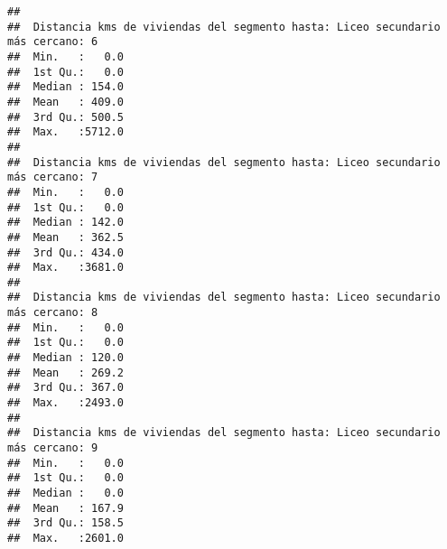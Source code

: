 \documentclass[11pt,]{article}
\begin{document}
\begin{verbatim}
##                                                                                
##  Distancia kms de viviendas del segmento hasta: Liceo secundario más cercano: 6
##  Min.   :   0.0                                                                
##  1st Qu.:   0.0                                                                
##  Median : 154.0                                                                
##  Mean   : 409.0                                                                
##  3rd Qu.: 500.5                                                                
##  Max.   :5712.0                                                                
##                                                                                
##  Distancia kms de viviendas del segmento hasta: Liceo secundario más cercano: 7
##  Min.   :   0.0                                                                
##  1st Qu.:   0.0                                                                
##  Median : 142.0                                                                
##  Mean   : 362.5                                                                
##  3rd Qu.: 434.0                                                                
##  Max.   :3681.0                                                                
##                                                                                
##  Distancia kms de viviendas del segmento hasta: Liceo secundario más cercano: 8
##  Min.   :   0.0                                                                
##  1st Qu.:   0.0                                                                
##  Median : 120.0                                                                
##  Mean   : 269.2                                                                
##  3rd Qu.: 367.0                                                                
##  Max.   :2493.0                                                                
##                                                                                
##  Distancia kms de viviendas del segmento hasta: Liceo secundario más cercano: 9
##  Min.   :   0.0                                                                
##  1st Qu.:   0.0                                                                
##  Median :   0.0                                                                
##  Mean   : 167.9                                                                
##  3rd Qu.: 158.5                                                                
##  Max.   :2601.0                                                                

\end{verbatim}
\end{document}

